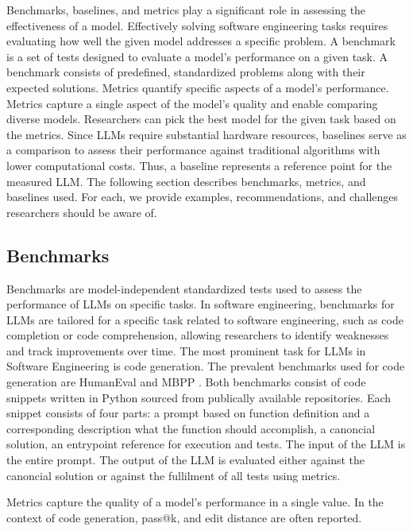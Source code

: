 \documentclass[11pt]{article}
\begin{document}
Benchmarks, baselines, and metrics play a significant role in assessing the effectiveness of a model.
Effectively solving software engineering tasks requires evaluating how well the given model addresses a specific problem.
A benchmark is a set of tests designed to evaluate a model's performance on a given task.
A benchmark consists of predefined, standardized problems along with their expected solutions.
Metrics quantify specific aspects of a model's performance.
Metrics capture a single aspect of the model's quality and enable comparing diverse models.
Researchers can pick the best model for the given task based on the metrics.
Since LLMs require substantial hardware resources, baselines serve as a comparison to assess their performance against traditional algorithms with lower computational costs.
Thus, a baseline represents a reference point for the measured LLM.
The following section describes benchmarks, metrics, and baselines used.
For each, we provide examples, recommendations, and challenges researchers should be aware of.

\subsection{Benchmarks}

Benchmarks are model-independent standardized tests used to assess the performance of LLMs on specific tasks.
In software engineering, benchmarks for LLMs are tailored for a specific task related to software engineering, such as code completion or code comprehension, allowing researchers to identify weaknesses and track improvements over time.
The most prominent task for LLMs in Software Engineering is code generation.
The prevalent benchmarks used for code generation are HumanEval \cite{TODO} and MBPP \cite{MBPP}.
Both benchmarks consist of code snippets written in Python sourced from publically available repositories.
Each snippet consists of four parts: a prompt based on function definition and a corresponding description what the function should accomplish, a canoncial solution, an entrypoint reference for execution and tests.
The input of the LLM is the entire prompt.
The output of the LLM is evaluated either against the canoncial solution or against the fullilment of all tests using metrics.

Metrics capture the quality of a model's performance in a single value.
In the context of code generation, pass@k, and edit distance are often reported.
\end{document}
